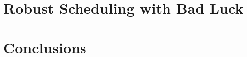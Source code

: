 \documentclass{beamer}
\newcommand{\real}{I\!\!\!R}
\newcommand{\tblue}{\textcolor{blue}}
\begin{document}
%
%
%
%
%
%
%
%
%
%
%
%
%
%
%
%
%
%


\section{Robust Scheduling with Bad Luck}


\section{Conclusions}
\end{document}
